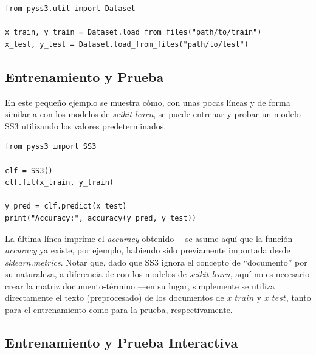 \begin{verbatim}
from pyss3.util import Dataset

x_train, y_train = Dataset.load_from_files("path/to/train")
x_test, y_test = Dataset.load_from_files("path/to/test")
\end{verbatim}


\subsection{Entrenamiento y Prueba}
\label{sec:eg-1}

En este pequeño ejemplo se muestra cómo, con unas pocas líneas y de forma similar a con los modelos de \emph{scikit-learn}, se puede entrenar y probar un modelo SS3 utilizando los valores predeterminados.

\begin{verbatim}
from pyss3 import SS3

clf = SS3()
clf.fit(x_train, y_train)

y_pred = clf.predict(x_test)
print("Accuracy:", accuracy(y_pred, y_test))
\end{verbatim}

La última línea imprime el \emph{accuracy} obtenido ---se asume aquí que la función \emph{accuracy} ya existe, por ejemplo, habiendo sido previamente importada desde \emph{sklearn.metrics}.
Notar que, dado que SS3 ignora el concepto de ``documento'' por su naturaleza, a diferencia de con los modelos de \emph{scikit-learn}, aquí no es necesario crear la matriz documento-término ---en su lugar, simplemente se utiliza directamente el texto (preprocesado) de los documentos de $x\_train$ y $x\_test$, tanto para el entrenamiento como para la prueba, respectivamente.


\subsection{Entrenamiento y Prueba Interactiva}
\label{sec:eg-2}

